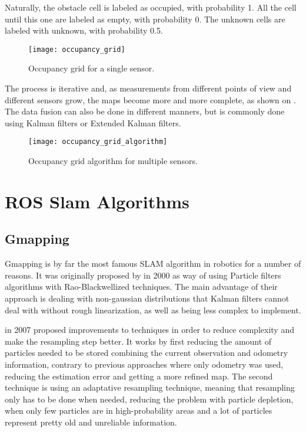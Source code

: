 Naturally, the obstacle cell is labeled as occupied, with probability 1. All the cell until this one are labeled as empty, with probability 0. The unknown cells are labeled with unknown, with probability 0.5.

\begin{figure}[!ht]
    \centering
    \texttt{[image: occupancy\_grid]}
    \caption{Occupancy grid for a single sensor.}
    \label{fig:occupancy_grid}
\end{figure}

The process is iterative and, as measurements from different points of view and different sensors grow, the maps become more and more complete, as shown on . The data fusion can also be done in different manners, but is commonly done using Kalman filters or Extended Kalman filters.

\begin{figure}[!ht]
    \centering
    \texttt{[image: occupancy\_grid\_algorithm]}
    \caption{Occupancy grid algorithm for multiple sensors.}
    \label{fig:occupancy_grid_algorithm}
\end{figure}

\section{ROS Slam Algorithms}

\subsection{Gmapping}

Gmapping is by far the most famous SLAM algorithm in robotics for a number of reasons. It was originally proposed by \citeauthor{doucet2000rao} in 2000 as way of using Particle filters algorithms with Rao-Blackwellized techniques. The main advantage of their approach is dealing with non-gaussian distributions that Kalman filters cannot deal with without rough linearization, as well as being less complex to implement.

\citeauthor{grisetti2007improved} in 2007 proposed improvements to \citeauthor{doucet2000rao} techniques in order to reduce complexity and make the resampling step better. It works by first reducing the amount of particles needed to be stored combining the current observation and odometry information, contrary to previous approaches where only odometry was used, reducing the estimation error and getting a more refined map. The second technique is using an adaptative resampling technique, meaning that resampling only has to be done when needed, reducing the problem with particle depletion, when only few particles are in high-probability areas and a lot of particles represent pretty old and unreliable information.

